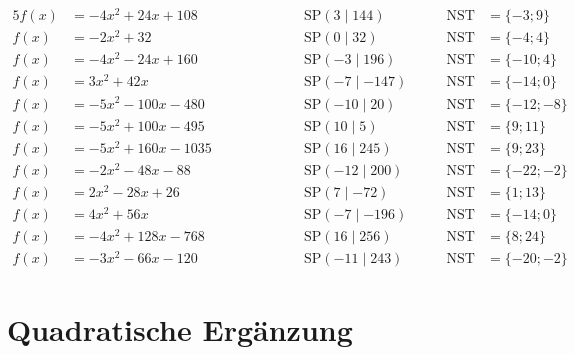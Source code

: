 \documentclass
[
  draft    = true,
  fontsize = 11pt,
  parskip  = half-,
  BCOR     = 0pt,
  DIV      = 11
]
{scrartcl}
\begin{document}
\begin{alignat*}{5}
  f(x)&=-4x^{2}+24x+108 \qquad&\qquad \quad&\text{SP}(3\mid144) \quad&\quad \text{NST}&=\{-3;9\} \\[0.5ex]
  f(x)&=-2x^{2}+32 \qquad&\qquad \quad&\text{SP}(0\mid32) \quad&\quad \text{NST}&=\{-4;4\} \\[0.5ex]
  f(x)&=-4x^{2}-24x+160 \qquad&\qquad \quad&\text{SP}(-3\mid196) \quad&\quad \text{NST}&=\{-10;4\} \\[0.5ex]
  f(x)&=3x^{2}+42x \qquad&\qquad \quad&\text{SP}(-7\mid-147) \quad&\quad \text{NST}&=\{-14;0\} \\[0.5ex]
  f(x)&=-5x^{2}-100x-480 \qquad&\qquad \quad&\text{SP}(-10\mid20) \quad&\quad \text{NST}&=\{-12;-8\} \\[0.5ex]
  f(x)&=-5x^{2}+100x-495 \qquad&\qquad \quad&\text{SP}(10\mid5) \quad&\quad \text{NST}&=\{9;11\} \\[0.5ex]
  f(x)&=-5x^{2}+160x-1035 \qquad&\qquad \quad&\text{SP}(16\mid245) \quad&\quad \text{NST}&=\{9;23\} \\[0.5ex]
  f(x)&=-2x^{2}-48x-88 \qquad&\qquad \quad&\text{SP}(-12\mid200) \quad&\quad \text{NST}&=\{-22;-2\} \\[0.5ex]
  f(x)&=2x^{2}-28x+26 \qquad&\qquad \quad&\text{SP}(7\mid-72) \quad&\quad \text{NST}&=\{1;13\} \\[0.5ex]
  f(x)&=4x^{2}+56x \qquad&\qquad \quad&\text{SP}(-7\mid-196) \quad&\quad \text{NST}&=\{-14;0\} \\[0.5ex]
  f(x)&=-4x^{2}+128x-768 \qquad&\qquad \quad&\text{SP}(16\mid256) \quad&\quad \text{NST}&=\{8;24\} \\[0.5ex]
  f(x)&=-3x^{2}-66x-120 \qquad&\qquad \quad&\text{SP}(-11\mid243) \quad&\quad \text{NST}&=\{-20;-2\}
\end{alignat*}

\clearpage
\section*{Quadratische Ergänzung}
\end{document}

